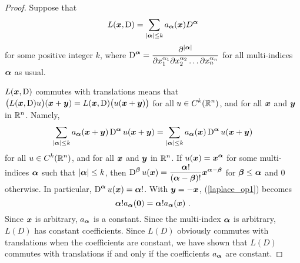\begin{proof}
\stage{$\Rightarrow$}
Suppose that
\[
L({\bm{x}},\operatorname{D}) = \sum_{|{\bm{\alpha}}|\leq k}
a_{{\bm{\alpha}}}({\bm{x}}) D^{{\bm{\alpha}}}
\]
for some positive integer $k$, where
$\displaystyle \operatorname{D}^{{\bm{\alpha}}}
= \frac{\partial^{|{\bm{\alpha}}|}}{\partial x_1^{\alpha_1}
\partial x_2^{\alpha_2} \ldots \partial x_n^{\alpha_n}}$ for all
multi-indices ${\bm{\alpha}}$ as usual.

$L({\bm{x}},\operatorname{D})$ commutes with translations means that
$\displaystyle \big(L({\bm{x}},\operatorname{D})u\big)({\bm{x}}+{\bm{y}}) =
L({\bm{x}},\operatorname{D})\big( u({\bm{x}}+{\bm{y}}) \big)$ for all
$\displaystyle u\in C^k(\mathbb{R}^n)$, and for
all ${\bm{x}}$ and ${\bm{y}}$ in $\mathbb{R}^n$.  Namely,
\begin{align} \label{laplace_op1}
\sum_{|{\bm{\alpha}}|\leq k} a_{{\bm{\alpha}}}({\bm{x}}+{\bm{y}})
\operatorname{D}^{{\bm{\alpha}}} u({\bm{x}}+{\bm{y}})
= \sum_{|{\bm{\alpha}}|\leq k} a_{{\bm{\alpha}}}({\bm{x}})
\operatorname{D}^{{\bm{\alpha}}} u({\bm{x}}+{\bm{y}})
\end{align}
for all $\displaystyle u\in C^k(\mathbb{R}^n)$, and for all ${\bm{x}}$ and
${\bm{y}}$ in $\displaystyle \mathbb{R}^n$.  If
$\displaystyle u({\bm{x}}) = {\bm{x}}^{{\bm{\alpha}}}$ for some multi-indices
${\bm{\alpha}}$ such that $|{\bm{\alpha}}|\leq k$, then
$\displaystyle \operatorname{D}^{{\bm{\beta}}} u({\bm{x}})
= \frac{{\bm{\alpha}}!}{({\bm{\alpha}}-{\bm{\beta}})!}
{\bm{x}}^{{\bm{\alpha}}-{\bm{\beta}}}$
for ${\bm{\beta}} \leq {\bm{\alpha}}$ and $0$ otherwise.  In particular,
$\operatorname{D}^{{\bm{\alpha}}} u({\bm{x}}) = {\bm{\alpha}}!$.  With ${\bm{y}} = - {\bm{x}}$,
(\ref{laplace_op1}) becomes
\[
{\bm{\alpha}}! a_{{\bm{\alpha}}}({\bm{0}})
= {\bm{\alpha}}! a_{{\bm{\alpha}}}({\bm{x}}) \ .
\]
Since ${\bm{x}}$ is arbitrary, $a_{{\bm{\alpha}}}$ is a constant.
Since the multi-index ${\bm{\alpha}}$ is arbitrary, $L(D)$ has constant
coefficients.  Since $L(D)$ obviously commutes with translations when
the coefficients are constant, we have shown that $L(D)$ commutes with
translations if and only if the coefficients $a_{{\bm{\alpha}}}$ are constant.


\end{proof}
